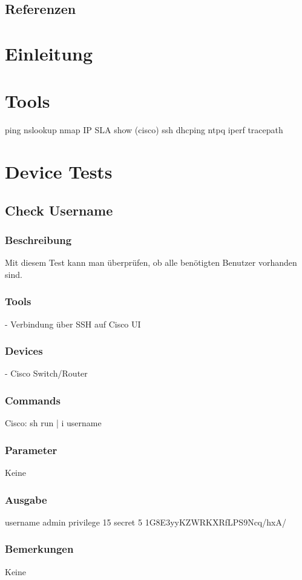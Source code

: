 \documentclass[a4,12pt]{scrartcl}
\begin{document}
\subsection{Referenzen}

\newpage
\section{Einleitung}

\newpage
\section{Tools}

ping
nslookup
nmap
IP SLA
show (cisco)
ssh
dhcping
ntpq
iperf
tracepath
\newpage
\section{Device Tests}

\subsection{Check Username}
\subsubsection{Beschreibung}
Mit diesem Test kann man überprüfen, ob alle benötigten Benutzer vorhanden sind.
\subsubsection{Tools}
- Verbindung über SSH auf Cisco UI 
\subsubsection{Devices}
- Cisco Switch/Router
\subsubsection{Commands}
Cisco: sh run | i username
\subsubsection{Parameter}
Keine
\subsubsection{Ausgabe}
username admin privilege 15 secret 5 1G8E3yyKZWRKXRfLPS9Ncq/hxA/
\subsubsection{Bemerkungen}
Keine
\end{document}
